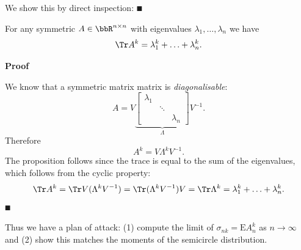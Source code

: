 We show this by direct inspection:
\ensuremath{\QED}

\begin{proposition} For any symmetric $A \ensuremath{\in} \ensuremath{\bbR}^{n \ensuremath{\times} n}$ with eigenvalues $\ensuremath{\lambda}_1,\ensuremath{\ldots},\ensuremath{\lambda}_n$ we have
\[
\Tr A^k = \ensuremath{\lambda}_1^k + \ensuremath{\ldots} + \ensuremath{\lambda}_n^k.
\]
\end{proposition}
\textbf{Proof}

We know that a symmetric matrix matrix is \emph{diagonalisable}:
\[
A = V \underbrace{\begin{bmatrix} \ensuremath{\lambda}_1 &  &  \\  & \ensuremath{\ddots} &  \\  &  & \ensuremath{\lambda}_n \end{bmatrix}}_{\ensuremath{\Lambda}} V^{-1}.
\]
Therefore
\[
A^k = V \ensuremath{\Lambda}^k V^{-1}.
\]
The proposition follows since the trace is equal to the sum of the eigenvalues, which follows from the cyclic property:
\[
\Tr A^k = \Tr V (\ensuremath{\Lambda}^k V^{-1}) = \Tr (\ensuremath{\Lambda}^k V^{-1})V = \Tr \ensuremath{\Lambda}^k = \ensuremath{\lambda}_1^k + \ensuremath{\ldots} + \ensuremath{\lambda}_n^k.
\]
\ensuremath{\QED}

Thus we have a plan of attack: (1) compute the limit of $\ensuremath{\sigma}_{nk} = \ensuremath{\bm{\mathrm{E}}} A_n^k$ as $n \ensuremath{\rightarrow} \ensuremath{\infty}$ and (2) show this matches the moments of the semicircle distribution.

